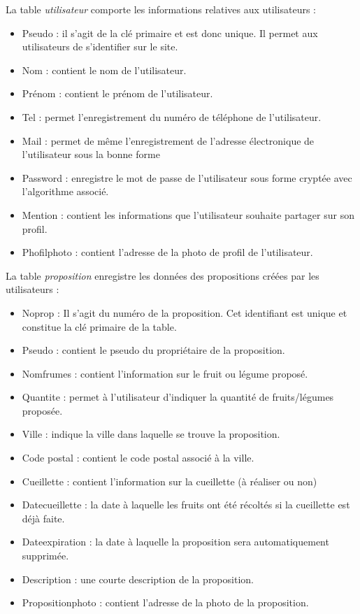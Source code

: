 \documentclass{article}
\begin{document}
La table \textit{utilisateur} comporte les informations relatives aux utilisateurs :
\begin{itemize}
    \item Pseudo : il s’agit de la clé primaire et est donc unique. Il permet aux utilisateurs de s’identifier sur le site.
    \item Nom : contient le nom de l’utilisateur.
    \item Prénom : contient le prénom de l’utilisateur.
    \item Tel : permet l’enregistrement du numéro de téléphone de l’utilisateur.
    \item Mail : permet de même l’enregistrement de l’adresse électronique de l’utilisateur sous la bonne forme
    \item Password : enregistre le mot de passe de l’utilisateur sous forme cryptée avec l’algorithme associé.
    \item Mention : contient les informations que l’utilisateur souhaite partager sur son profil.
    \item Phofilphoto : contient l’adresse de la photo de profil de l’utilisateur.
\end{itemize}

La table \textit{proposition} enregistre les données des propositions créées par les utilisateurs :

\begin{itemize}
    \item Noprop : Il s’agit du numéro de la proposition. Cet identifiant est unique et constitue la clé primaire de la table.
    \item Pseudo : contient le pseudo du propriétaire de la proposition.
    \item Nomfrumes : contient l’information sur le fruit ou légume proposé.
    \item Quantite : permet à l’utilisateur d’indiquer la quantité de fruits/légumes proposée.
    \item Ville : indique la ville dans laquelle se trouve la proposition.
    \item Code postal : contient le code postal associé à la ville.
    \item Cueillette : contient l’information sur la cueillette (à réaliser ou non)
    \item Datecueillette : la date à laquelle les fruits ont été récoltés si la cueillette est déjà faite.
    \item Dateexpiration : la date à laquelle la proposition sera automatiquement supprimée.
    \item Description : une courte description de la proposition.
    \item Propositionphoto : contient l’adresse de la photo de la proposition.
\end{itemize}
\end{document}
